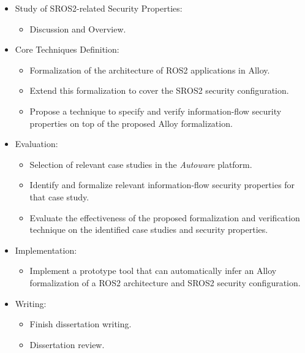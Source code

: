 \begin{itemize}
\item Study of SROS2-related Security Properties:
    \begin{itemize}
        \item Discussion and Overview.
    \end{itemize}

\item Core Techniques Definition:
    \begin{itemize}
        \item Formalization of the architecture of ROS2 applications in Alloy.
        \item Extend this formalization to cover the SROS2 security configuration.
        \item Propose a technique to specify and verify information-flow security properties on top of the proposed Alloy formalization.
    \end{itemize}

\item Evaluation:
    \begin{itemize}
        \item Selection of relevant case studies in the \textit{Autoware} platform.
        \item Identify and formalize relevant information-flow security properties for that case study.
        \item Evaluate the effectiveness of the proposed formalization and verification technique on the identified case studies and security properties.
    \end{itemize}

\item Implementation:
    \begin{itemize}
        \item Implement a prototype tool that can automatically infer an Alloy formalization of a ROS2 architecture and SROS2 security configuration.
    \end{itemize}

\item Writing:
    \begin{itemize}
        \item Finish dissertation writing.
        \item Dissertation review.
    \end{itemize}
\end{itemize}